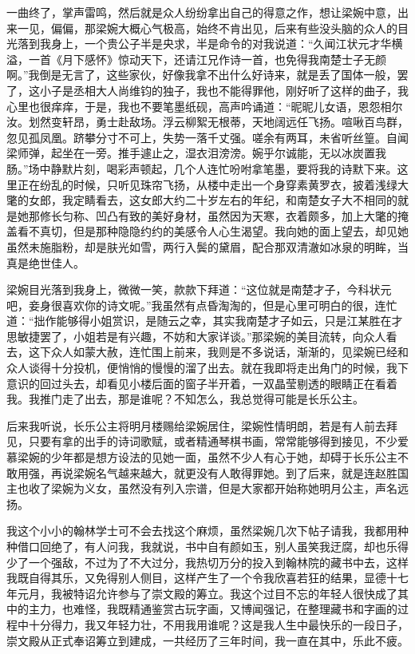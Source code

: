 一曲终了，掌声雷鸣，然后就是众人纷纷拿出自己的得意之作，想让梁婉中意，出来一见，偏偏，那梁婉大概心气极高，始终不肯出见，后来有些没头脑的众人的目光落到我身上，一个贵公子半是央求，半是命令的对我说道：“久闻江状元才华横溢，一首《月下感怀》惊动天下，还请江兄作诗一首，也免得我南楚士子无颜啊。”我倒是无言了，这些家伙，好像我拿不出什么好诗来，就是丢了国体一般，罢了，这小子是丞相大人尚维钧的独子，我也不能得罪他，刚好听了这样的曲子，我心里也很痒痒，于是，我也不要笔墨纸砚，高声吟诵道：“昵昵儿女语，恩怨相尔汝。划然变轩昂，勇士赴敌场。浮云柳絮无根蒂，天地阔远任飞扬。喧啾百鸟群，忽见孤凤凰。跻攀分寸不可上，失势一落千丈强。嗟余有两耳，未省听丝篁。自闻梁师弹，起坐在一旁。推手遽止之，湿衣泪滂滂。婉乎尔诚能，无以冰炭置我肠。”场中静默片刻，喝彩声顿起，几个人连忙吩咐拿笔墨，要将我的诗默下来。这里正在纷乱的时候，只听见珠帘飞扬，从楼中走出一个身穿素黄罗衣，披着浅绿大氅的女郎，我定睛看去，这女郎大约二十岁左右的年纪，和南楚女子大不相同的就是她那修长匀称、凹凸有致的美好身材，虽然因为天寒，衣着颇多，加上大氅的掩盖看不真切，但是那种隐隐约约的美感令人心生渴望。我向她的面上望去，却见她虽然未施脂粉，却是肤光如雪，两行入鬓的黛眉，配合那双清澈如冰泉的明眸，当真是绝世佳人。

梁婉目光落到我身上，微微一笑，款款下拜道：“这位就是南楚才子，今科状元吧，妾身很喜欢你的诗文呢。”我虽然有点昏淘淘的，但是心里可明白的很，连忙道：“拙作能够得小姐赏识，是随云之幸，其实我南楚才子如云，只是江某胜在才思敏捷罢了，小姐若是有兴趣，不妨和大家详谈。”那梁婉的美目流转，向众人看去，这下众人如蒙大赦，连忙围上前来，我则是不多说话，渐渐的，见梁婉已经和众人谈得十分投机，便悄悄的慢慢的溜了出去。就在我即将走出角门的时候，我下意识的回过头去，却看见小楼后面的窗子半开着，一双晶莹剔透的眼睛正在看着我。我推门走了出去，那是谁呢？不知怎么，我总觉得可能是长乐公主。

后来我听说，长乐公主将明月楼赐给梁婉居住，梁婉性情明朗，若是有人前去拜见，只要有拿的出手的诗词歌赋，或者精通琴棋书画，常常能够得到接见，不少爱慕梁婉的少年都是想方设法的见她一面，虽然不少人有心于她，却碍于长乐公主不敢用强，再说梁婉名气越来越大，就更没有人敢得罪她。到了后来，就是连赵胜国主也收了梁婉为义女，虽然没有列入宗谱，但是大家都开始称她明月公主，声名远扬。

我这个小小的翰林学士可不会去找这个麻烦，虽然梁婉几次下帖子请我，我都用种种借口回绝了，有人问我，我就说，书中自有颜如玉，别人虽笑我迂腐，却也乐得少了一个强敌，不过为了不大过分，我热切万分的投入到翰林院的藏书中去，这样我既自得其乐，又免得别人侧目，这样产生了一个令我欣喜若狂的结果，显德十七年元月，我被特诏允许参与了崇文殿的筹立。我这个过目不忘的年轻人很快成了其中的主力，也难怪，我既精通鉴赏古玩字画，又博闻强记，在整理藏书和字画的过程中十分得力，我又年轻力壮，不用我用谁呢？这是我人生中最快乐的一段日子，崇文殿从正式奉诏筹立到建成，一共经历了三年时间，我一直在其中，乐此不疲。

